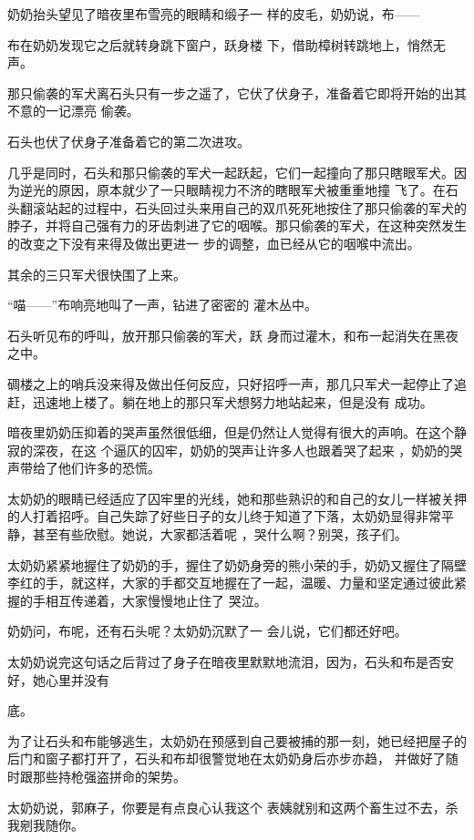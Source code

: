 \documentclass{article}
\begin{document}
奶奶抬头望见了暗夜里布雪亮的眼睛和缎子一
样的皮毛，奶奶说，布—— 

布在奶奶发现它之后就转身跳下窗户，跃身楼
下，借助樟树转跳地上，悄然无声。 

那只偷袭的军犬离石头只有一步之遥了，它伏了伏身子，准备着它即将开始的出其不意的一记漂亮
偷袭。 


石头也伏了伏身子准备着它的第二次进攻。 

几乎是同时，石头和那只偷袭的军犬一起跃起，它们一起撞向了那只瞎眼军犬。因为逆光的原因，原本就少了一只眼睛视力不济的瞎眼军犬被重重地撞
\newpage
飞了。在石头翻滚站起的过程中，石头回过头来用自己的双爪死死地按住了那只偷袭的军犬的脖子，并将自己强有力的牙齿刺进了它的咽喉。那只偷袭的军犬，在这种突然发生的改变之下没有来得及做出更进一
步的调整，血已经从它的咽喉中流出。 


其余的三只军犬很快围了上来。 

“喵——”布响亮地叫了一声，钻进了密密的
灌木丛中。 

石头听见布的呼叫，放开那只偷袭的军犬，跃
身而过灌木，和布一起消失在黑夜之中。 

碉楼之上的哨兵没来得及做出任何反应，只好招呼一声，那几只军犬一起停止了追赶，迅速地上楼了。躺在地上的那只军犬想努力地站起来，但是没有
成功。 

暗夜里奶奶压抑着的哭声虽然很低细，但是仍然让人觉得有很大的声响。在这个静寂的深夜，在这
\newpage
个逼仄的囚牢，奶奶的哭声让许多人也跟着哭了起来
，奶奶的哭声带给了他们许多的恐慌。 

太奶奶的眼睛已经适应了囚牢里的光线，她和那些熟识的和自己的女儿一样被关押的人打着招呼。自己失踪了好些日子的女儿终于知道了下落，太奶奶显得非常平静，甚至有些欣慰。她说，大家都活着呢
，哭什么啊？别哭，孩子们。 

太奶奶紧紧地握住了奶奶的手，握住了奶奶身旁的熊小荣的手，奶奶又握住了隔壁李红的手，就这样，大家的手都交互地握在了一起，温暖、力量和坚定通过彼此紧握的手相互传递着，大家慢慢地止住了
哭泣。 

奶奶问，布呢，还有石头呢？太奶奶沉默了一
会儿说，它们都还好吧。 

太奶奶说完这句话之后背过了身子在暗夜里默默地流泪，因为，石头和布是否安好，她心里并没有

\newpage
底。 

为了让石头和布能够逃生，太奶奶在预感到自己要被捕的那一刻，她已经把屋子的后门和窗子都打开了，石头和布却很警觉地在太奶奶身后亦步亦趋，
并做好了随时跟那些持枪强盗拼命的架势。 

太奶奶说，郭麻子，你要是有点良心认我这个
表姨就别和这两个畜生过不去，杀我剜我随你。 
\end{document}
